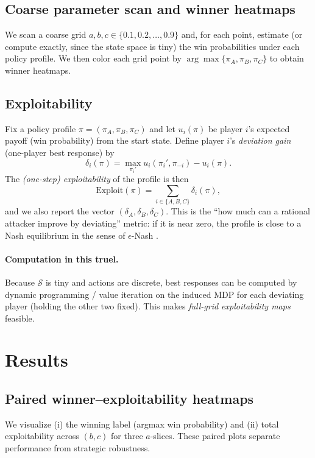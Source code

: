 \documentclass[11pt]{article}
\begin{document}
\subsection{Coarse parameter scan and winner heatmaps}
We scan a coarse grid $a,b,c \in \{0.1,0.2,\dots,0.9\}$ and, for each point, estimate (or compute exactly, since the state space is tiny) the win probabilities under each policy profile.
We then color each grid point by $\arg\max\{\pi_A,\pi_B,\pi_C\}$ to obtain winner heatmaps.

\subsection{Exploitability}
Fix a policy profile $\pi=(\pi_A,\pi_B,\pi_C)$ and let $u_i(\pi)$ be player $i$'s expected payoff (win probability) from the start state.
Define player $i$'s \emph{deviation gain} (one-player best response) by
\[
\delta_i(\pi)= \max_{\pi_i'} u_i(\pi_i',\pi_{-i}) - u_i(\pi).
\]
The \emph{(one-step) exploitability} of the profile is then
\[
\mathrm{Exploit}(\pi)=\sum_{i\in\{A,B,C\}}\delta_i(\pi),
\]
and we also report the vector $(\delta_A,\delta_B,\delta_C)$.
This is the ``how much can a rational attacker improve by deviating'' metric: if it is near zero, the profile is close to a Nash equilibrium in the sense of $\epsilon$-Nash \citep{TimbersEtAl2020}.

\paragraph{Computation in this truel.}
Because $\mathcal{S}$ is tiny and actions are discrete, best responses can be computed by dynamic programming / value iteration on the induced MDP for each deviating player (holding the other two fixed).
This makes \emph{full-grid exploitability maps} feasible.

\section{Results}

\subsection{Paired winner--exploitability heatmaps}
We visualize (i) the winning label (argmax win probability) and (ii) total exploitability across $(b,c)$ for three $a$-slices. These paired plots separate performance from strategic robustness.
\end{document}
